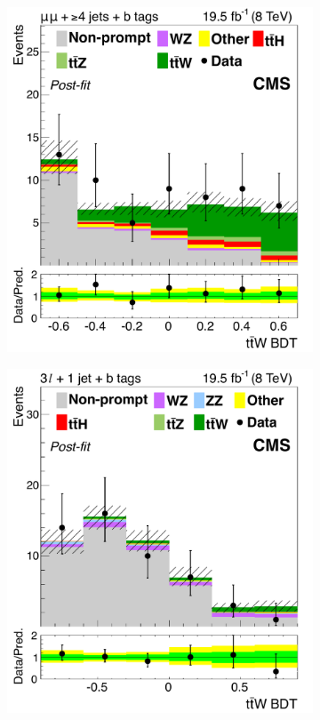 \begin{figure}[tb]
\begin{subfigure}{0.33\textwidth}
    \caption{}
    \label{sfig:8-ttW-cc}
  \end{subfigure}%
  \begin{subfigure}{0.33\textwidth}
    \includegraphics[width=\textwidth]{figures/eight-TeV/mva/mu_mu_ge4j_bloose_FinalBDT}
    \caption{}
  \end{subfigure}
  \begin{subfigure}{0.33\textwidth}
    \includegraphics[width=\textwidth]{figures/eight-TeV/mva/3l_eq1j_bloose_FinalBDT}

\end{subfigure}
\end{figure}
